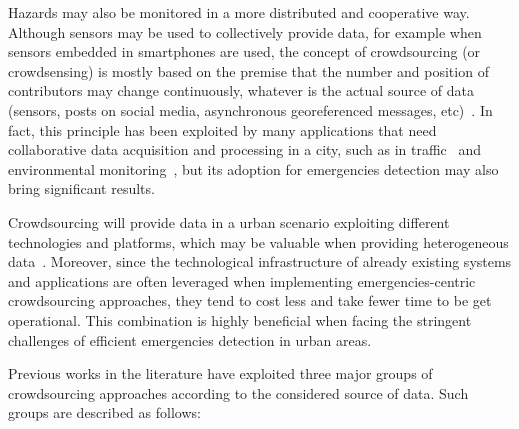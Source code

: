 \begin{refsection}
Hazards may also be monitored in a more distributed and cooperative way. Although sensors may be used to collectively provide data, for example when sensors embedded in smartphones are used, the concept of crowdsourcing (or crowdsensing) is mostly based on the premise that the number and position of contributors may change continuously, whatever is the actual source of data (sensors, posts on social media, asynchronous georeferenced messages, etc)~\cite{crowdsourcing2}. In fact, this principle has been exploited by many applications that need collaborative data acquisition and processing in a city, such as in traffic~\cite{citiesvehicles2} and environmental monitoring~\cite{bikesensor}, but its adoption for emergencies detection may also bring significant results. 

Crowdsourcing will provide data in a urban scenario exploiting different technologies and platforms, which may be valuable when providing heterogeneous data~\cite{crowdsourcing6}. Moreover, since the technological infrastructure of already existing systems and applications are often leveraged when implementing emergencies-centric crowdsourcing approaches, they tend to cost less and take fewer time to be get operational. This combination is highly beneficial when facing the stringent challenges of efficient emergencies detection in urban areas.

Previous works in the literature have exploited three major groups of crowdsourcing approaches according to the considered source of data. Such groups are described as follows:  


\end{refsection}
